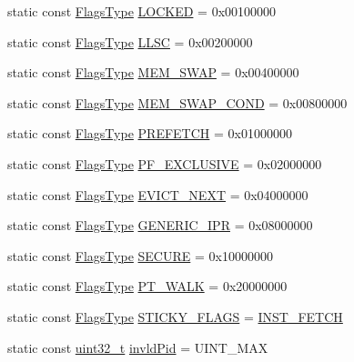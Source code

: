 \begin{DoxyCompactItemize}
\item 
static const \hyperlink{classRequest_a2da503161d95c65aea559dbabcf570aa}{FlagsType} \hyperlink{classRequest_a94c7f94a4d702cb260f87a21f4485e8f}{LOCKED} = 0x00100000
\item 
static const \hyperlink{classRequest_a2da503161d95c65aea559dbabcf570aa}{FlagsType} \hyperlink{classRequest_ae940f472047b661a3913d069f9c3bea3}{LLSC} = 0x00200000
\item 
static const \hyperlink{classRequest_a2da503161d95c65aea559dbabcf570aa}{FlagsType} \hyperlink{classRequest_a121993e008dc808d117858dfafd21ae5}{MEM\_\-SWAP} = 0x00400000
\item 
static const \hyperlink{classRequest_a2da503161d95c65aea559dbabcf570aa}{FlagsType} \hyperlink{classRequest_a7230a85ab11e7e5f89eddc963161279f}{MEM\_\-SWAP\_\-COND} = 0x00800000
\item 
static const \hyperlink{classRequest_a2da503161d95c65aea559dbabcf570aa}{FlagsType} \hyperlink{classRequest_a493dbbff4fa5325d5492ccd772bb47be}{PREFETCH} = 0x01000000
\item 
static const \hyperlink{classRequest_a2da503161d95c65aea559dbabcf570aa}{FlagsType} \hyperlink{classRequest_ac84dc044b65651320e9fe1087e110ddc}{PF\_\-EXCLUSIVE} = 0x02000000
\item 
static const \hyperlink{classRequest_a2da503161d95c65aea559dbabcf570aa}{FlagsType} \hyperlink{classRequest_ad9597d026fc64bd3cc9b56e2bafca9f4}{EVICT\_\-NEXT} = 0x04000000
\item 
static const \hyperlink{classRequest_a2da503161d95c65aea559dbabcf570aa}{FlagsType} \hyperlink{classRequest_accd8911f1ee38787b977ee8f122dcd5d}{GENERIC\_\-IPR} = 0x08000000
\item 
static const \hyperlink{classRequest_a2da503161d95c65aea559dbabcf570aa}{FlagsType} \hyperlink{classRequest_a096bc7521755b6680d9a1988a6c9b109}{SECURE} = 0x10000000
\item 
static const \hyperlink{classRequest_a2da503161d95c65aea559dbabcf570aa}{FlagsType} \hyperlink{classRequest_a55ac67fac829c3904728e74d5acf33af}{PT\_\-WALK} = 0x20000000
\item 
static const \hyperlink{classRequest_a2da503161d95c65aea559dbabcf570aa}{FlagsType} \hyperlink{classRequest_ad6eb90201da8e09a9d6b9029d8a8485c}{STICKY\_\-FLAGS} = \hyperlink{classRequest_a1137c9aff3d0aa2d9c0fafeb06ec7bc3}{INST\_\-FETCH}
\item 
static const \hyperlink{Type_8hh_a435d1572bf3f880d55459d9805097f62}{uint32\_\-t} \hyperlink{classRequest_ac5c3b2d7d6e9f98184fbfccb6ffc7273}{invldPid} = UINT\_\-MAX
\end{DoxyCompactItemize}
